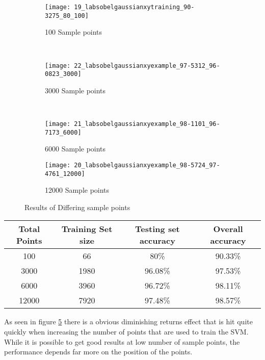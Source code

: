 \begin{figure}[h]
        \centering
        \begin{subfigure}[b]{0.3\textwidth}
                \centering
                \texttt{[image: 19\_labsobelgaussianxytraining\_90-3275\_80\_100]}
                \caption{100 Sample points}
                \label{fig:19_labsobelgaussianxytraining_90.3275_80_100}
        \end{subfigure}%
        ~ %
        \begin{subfigure}[b]{0.3\textwidth}
                \centering

                \texttt{[image: 22\_labsobelgaussianxyexample\_97-5312\_96-0823\_3000]}
                \caption{3000 Sample points}
                \label{fig:22_labsobelgaussianxyexample_97.5312_96.0823_3000}     
        \end{subfigure}
        ~
        \begin{subfigure}[b]{0.3\textwidth}
                \centering

                \texttt{[image: 21\_labsobelgaussianxyexample\_98-1101\_96-7173\_6000]}
                \caption{6000 Sample points}
                \label{fig:21_labsobelgaussianxyexample_98.1101_96.7173_6000}     
        \end{subfigure}
        \begin{subfigure}[b]{0.3\textwidth}
                \centering

                \texttt{[image: 20\_labsobelgaussianxyexample\_98-5724\_97-4761\_12000]}
                \caption{12000 Sample points}
                \label{fig:20_labsobelgaussianxyexample_98.5724_97.4761_12000}     
        \end{subfigure}
        \caption{Results of Differing sample points}\label{fig:samplepoints}
\end{figure}

\begin{center}
  \begin{tabular}{| c | c | c | c | }
    \hline
    \textbf{Total Points} & \textbf{Training Set size} & \textbf{Testing set accuracy} & \textbf{Overall accuracy} \\ \hline
    100 & 66 & 80\% & 90.33\% \\ \hline
    3000 & 1980 & 96.08\% & 97.53\% \\ \hline
    6000 & 3960 & 96.72\% & 98.11\% \\ \hline
    12000 & 7920 & 97.48\% & 98.57\% \\ 
    \hline
  \end{tabular}
\end{center}

As seen in figure \ref{fig:samplepoints} there is a obvious diminishing returns effect that is hit quite quickly when increasing the number of points that are used to train the SVM. While it is possible to get good results at low number of sample points, the performance depends far more on the position of the points.